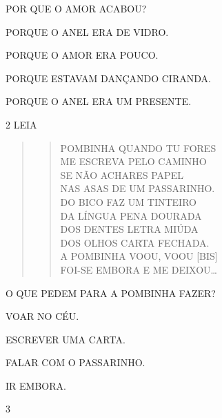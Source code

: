 \pagebreak
POR QUE O AMOR ACABOU?

\begin{escolha}
\item PORQUE O ANEL ERA DE VIDRO.

\item PORQUE O AMOR ERA POUCO.

\item PORQUE ESTAVAM DANÇANDO CIRANDA.

\item PORQUE O ANEL ERA UM PRESENTE.
\end{escolha}

\num{2} LEIA

\begin{quote}
\begin{verse}
POMBINHA QUANDO TU FORES\\
ME ESCREVA PELO CAMINHO\\
SE NÃO ACHARES PAPEL\\
NAS ASAS DE UM PASSARINHO.\\
DO BICO FAZ UM TINTEIRO\\
DA LÍNGUA PENA DOURADA\\
DOS DENTES LETRA MIÚDA\\
DOS OLHOS CARTA FECHADA.\\
A POMBINHA VOOU, VOOU [BIS]\\
FOI-SE EMBORA E ME DEIXOU\ldots{}
\end{verse}

\end{quote}

O QUE PEDEM PARA A POMBINHA FAZER?

\begin{escolha}
\item VOAR NO CÉU.

\item ESCREVER UMA CARTA.

\item FALAR COM O PASSARINHO.

\item IR EMBORA. 
\end{escolha}

\pagebreak
\num{3}

